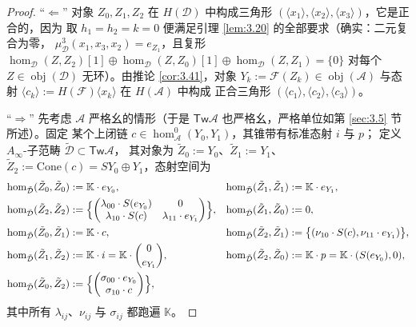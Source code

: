 \begin{proof}
“$\Leftarrow$” 对象 $Z_0,Z_1,Z_2$ 在 $H(\mathcal D)$ 中构成三角形
$(\langle x_1\rangle,\langle x_2\rangle,\langle x_3\rangle)$，它是正合的，因为
取 $h_1=h_2=k=0$ 便满足引理 \ref{lem:3.20} 的全部要求（确实：二元复合为零，
$\mu^3_{\mathcal D}(x_1,x_3,x_2)=e_{Z_1}$，且复形
$\hom_{\mathcal D}(Z,Z_2)[1]\oplus\hom_{\mathcal D}(Z,Z_0)[1]\oplus
\hom_{\mathcal D}(Z,Z_1)=\{0\}$ 对每个 $Z\in\operatorname{obj}(\mathcal D)$
无环）。由推论 \ref{cor:3.41}，对象 $Y_k:=\mathcal F(Z_k)\in
\operatorname{obj}(\mathcal A)$ 与态射
$\langle c_k\rangle:=H(\mathcal F)\langle x_k\rangle$ 在 $H(\mathcal A)$ 中构成
正合三角形 $(\langle c_1\rangle,\langle c_2\rangle,\langle c_3\rangle)$。

“$\Rightarrow$” 先考虑 $\mathcal A$ 严格幺的情形（于是
$\mathsf{Tw}\mathcal A$ 也严格幺，严格单位如第 \ref{sec:3.5} 节所述）。固定
某个上闭链 $c\in\hom^0_{\mathcal A}(Y_0,Y_1)$，其锥带有标准态射 $i$ 与 $p$；
定义 $A_\infty$-子范畴 $\tilde{\mathcal D}\subset\mathsf{Tw}\mathcal A$，
其对象为 $\tilde Z_0:=Y_0$、$\tilde Z_1:=Y_1$、
$\tilde Z_2:=\mathrm{Cone}(c)=SY_0\oplus Y_1$，态射空间为
\[
  \begin{aligned}
    \hom_{\tilde{\mathcal D}}(\tilde Z_0,\tilde Z_0)&:=\mathbb K\cdot e_{Y_0},
    &\hom_{\tilde{\mathcal D}}(\tilde Z_1,\tilde Z_1)&:=\mathbb K\cdot e_{Y_1},\\
    \hom_{\tilde{\mathcal D}}(\tilde Z_2,\tilde Z_2)&:=
    \Bigl\{\begin{pmatrix}\lambda_{00}\cdot S(e_{Y_0}) & 0\\
    \lambda_{10}\cdot S(c) & \lambda_{11}\cdot e_{Y_1}\end{pmatrix}\Bigr\},
    &\hom_{\tilde{\mathcal D}}(\tilde Z_1,\tilde Z_0)&:=0,\\
    \hom_{\tilde{\mathcal D}}(\tilde Z_0,\tilde Z_1)&:=\mathbb K\cdot c,
    &\hom_{\tilde{\mathcal D}}(\tilde Z_2,\tilde Z_1)&:=
    \bigl\{(\nu_{10}\cdot S(c),\nu_{11}\cdot e_{Y_1})\bigr\},\\
    \hom_{\tilde{\mathcal D}}(\tilde Z_1,\tilde Z_2)&:=\mathbb K\cdot i
    =\mathbb K\cdot\binom{0}{e_{Y_1}},
    &\hom_{\tilde{\mathcal D}}(\tilde Z_2,\tilde Z_0)&:=\mathbb K\cdot p
    =\mathbb K\cdot(S(e_{Y_0}),0),\\
    \hom_{\tilde{\mathcal D}}(\tilde Z_0,\tilde Z_2)&:=
    \Bigl\{\begin{pmatrix}\sigma_{00}\cdot e_{Y_0}\\
    \sigma_{10}\cdot c\end{pmatrix}\Bigr\},&&
  \end{aligned}
\]
其中所有 $\lambda_{ij}$、$\nu_{ij}$ 与 $\sigma_{ij}$ 都跑遍 $\mathbb K$。


\end{proof}
